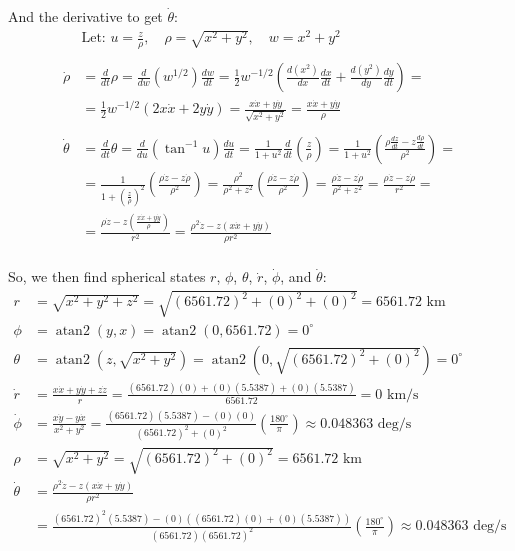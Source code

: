 \documentclass[titlepage]{article}
\begin{document}
And the derivative to get $\dot{\theta}$:
\begin{equation}
	\begin{split}
		&\text{Let: }u=\frac{z}{\rho},\quad\rho=\sqrt{x^2+y^2},\quad w=x^2+y^2 \\
		\\
		\dot{\rho}&=\frac{d}{dt}\rho=\frac{d}{dw}\left(w^{1/2}\right)\frac{dw}{dt}=\frac{1}{2}w^{-1/2}\left(\frac{d(x^2)}{dx}\frac{dx}{dt}+\frac{d(y^2)}{dy}\frac{dy}{dt}\right)= \\
		&=\frac{1}{2}w^{-1/2}\left(2x\dot{x}+2y\dot{y}\right)=\frac{x\dot{x}+y\dot{y}}{\sqrt{x^2+y^2}}=\frac{x\dot{x}+y\dot{y}}{\rho} \\
		\\
		\dot{\theta}&=\frac{d}{dt}\theta=\frac{d}{du}\left(\tan^{-1}u\right)\frac{du}{dt}=\frac{1}{1+u^2}\frac{d}{dt}\left(\frac{z}{\rho}\right)=\frac{1}{1+u^2}\left(\frac{\rho\frac{dz}{dt}-z\frac{d\rho}{dt}}{\rho^2}\right)= \\
		&=\frac{1}{1+\left(\frac{z}{\rho}\right)^2}\left(\frac{\rho\dot{z}-z\dot{\rho}}{\rho^2}\right)=\frac{\rho^2}{\rho^2+z^2}\left(\frac{\rho\dot{z}-z\dot{\rho}}{\rho^2}\right)=\frac{\rho\dot{z}-z\dot{\rho}}{\rho^2+z^2}=\frac{\rho\dot{z}-z\dot{\rho}}{r^2}= \\
				&=\frac{\rho\dot{z}-z\left(\frac{x\dot{x}+y\dot{y}}{\rho}\right)}{r^2}=\frac{\rho^2\dot{z}-z\left(x\dot{x}+y\dot{y}\right)}{\rho r^2} \\
	\end{split}
\end{equation}

So, we then find spherical states $r$, $\phi$, $\theta$, $\dot{r}$, $\dot{\phi}$, and $\dot{\theta}$:
\begin{equation}
	\begin{split}
		r&=\sqrt{x^2+y^2+z^2}=\sqrt{(6561.72)^2+(0)^2+(0)^2}=6561.72\text{ km} \\
		\phi&=\operatorname{atan2}(y,x)=\operatorname{atan2}(0,6561.72)=0^\circ \\
		\theta&=\operatorname{atan2}\left(z,\sqrt{x^2+y^2}\right)=\operatorname{atan2}\left(0,\sqrt{(6561.72)^2+(0)^2}\right)=0^\circ \\
		\dot{r}&=\frac{x\dot{x}+y\dot{y}+z\dot{z}}{r}=\frac{(6561.72)(0)+(0)(5.5387)+(0)(5.5387)}{6561.72}=0\text{ km/s} \\
		\dot{\phi}&=\frac{x\dot{y}-y\dot{x}}{x^2+y^2}=\frac{(6561.72)(5.5387)-(0)(0)}{(6561.72)^2+(0)^2}\left(\frac{180^\circ}{\pi}\right)\approx0.048363\text{ deg/s} \\
		\rho&=\sqrt{x^2+y^2}=\sqrt{(6561.72)^2+(0)^2}=6561.72\text{ km} \\
		\dot{\theta}&=\frac{\rho^2\dot{z}-z\left(x\dot{x}+y\dot{y}\right)}{\rho r^2} \\
		&=\frac{(6561.72)^2(5.5387)-(0)\left((6561.72)(0)+(0)(5.5387)\right)}{(6561.72)(6561.72)^2}\left(\frac{180^\circ}{\pi}\right)\approx0.048363\text{ deg/s}
	\end{split}
\end{equation}
\end{document}
